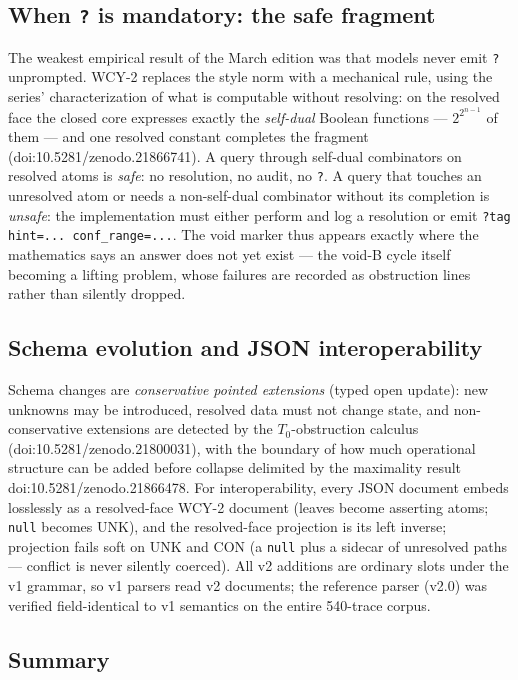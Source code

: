 \documentclass[11pt,a4paper]{article}
\begin{document}
\subsection{When \texttt{?} is mandatory: the safe fragment}

The weakest empirical result of the March edition was that models never
emit \texttt{?} unprompted. WCY-2 replaces the style norm with a
mechanical rule, using the series' characterization of what is
computable without resolving: on the resolved face the closed core
expresses exactly the \emph{self-dual} Boolean functions ---
$2^{2^{n-1}}$ of them --- and one resolved constant completes the
fragment (doi:10.5281/zenodo.21866741). A query through self-dual
combinators on resolved atoms is \emph{safe}: no resolution, no audit,
no \texttt{?}. A query that touches an unresolved atom or needs a
non-self-dual combinator without its completion is \emph{unsafe}: the
implementation must either perform and log a resolution or emit
\texttt{?tag hint=...\ conf\_range=...}. The void marker thus appears
exactly where the mathematics says an answer does not yet exist ---
the void-B cycle itself becoming a lifting problem, whose failures are
recorded as obstruction lines rather than silently dropped.

\subsection{Schema evolution and JSON interoperability}
\label{sec:wcy2-schema}

Schema changes are \emph{conservative pointed extensions} (typed open
update): new unknowns may be introduced, resolved data must not change
state, and non-conservative extensions are detected by the
$T_0$-obstruction calculus (doi:10.5281/zenodo.21800031), with the
boundary of how much operational structure can be added before collapse
delimited by the maximality result doi:10.5281/zenodo.21866478. For
interoperability, every JSON document embeds losslessly as a
resolved-face WCY-2 document (leaves become asserting atoms;
\texttt{null} becomes $\mathrm{UNK}$), and the resolved-face projection
is its left inverse; projection fails soft on $\mathrm{UNK}$ and
$\mathrm{CON}$ (a \texttt{null} plus a sidecar of unresolved paths ---
conflict is never silently coerced). All v2 additions are ordinary slots
under the v1 grammar, so v1 parsers read v2 documents; the reference
parser (v2.0) was verified field-identical to v1 semantics on the entire
540-trace corpus.

\subsection{Summary}
\end{document}
